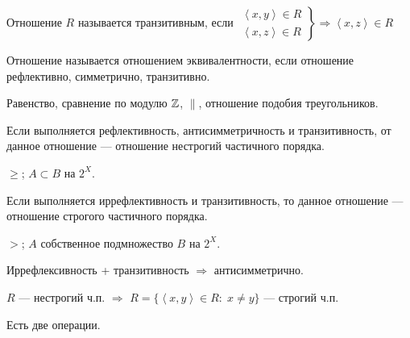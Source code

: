 \begin{definition}
    Отношение $R$ называется транзитивным, если  $\left. \begin{array}{r} \left<x, y\right> \in R \\ \left<x, z\right> \in R\end{array} \right\} \Rightarrow \left<x, z\right> \in R$
\end{definition}
 \begin{definition}
    Отношение называется отношением эквивалентности, если отношение рефлективно, симметрично, транзитивно.
\end{definition}
\begin{example}
    Равенство, сравнение по модулю $\mathbb{Z}$,  $\|$, отношение подобия треугольников.
\end{example}
\begin{definition}
    Если выполняется рефлективность, антисимметричность и транзитивность, от данное отношение --- отношение нестрогий частичного порядка.
\end{definition}
\begin{example}
    $\ge$; $A \subset B$ на $2^X$. 
\end{example}
\begin{definition}
    Если выполняется иррефлективность и транзитивность, то данное отношение --- отношение строгого частичного порядка. 
\end{definition}
 \begin{example}
    $>$;  $A$ собственное подмножество  $B$ на  $2^X$.
\end{example}
\begin{exerc}
    Иррефлексивность + транзитивность $\Rightarrow$ антисимметрично.
\end{exerc}
\begin{exerc}
    $R$ --- нестрогий ч.п.  $\Rightarrow$ $R = \{\left<x,y\right> \in R: \; x \neq y\}$ --- строгий ч.п.
\end{exerc}
Есть две операции.
